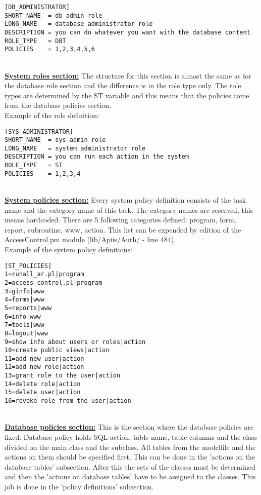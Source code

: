 \begin{verbatim}
[DB_ADMINISTRATOR]
SHORT_NAME  = db admin role 
LONG_NAME   = database administrator role
DESCRIPTION = you can do whatever you want with the database content
ROLE_TYPE   = DBT
POLICIES    = 1,2,3,4,5,6
\end{verbatim} 

\textbf{} \\
\underline{\textbf{System roles section:}}
The structure for this section is almost the same as for the database role section and the difference is in the role type only. The role types are determined by the ST variable and this means that the policies come from the database policies section.\\
\linebreak 
Example of the role definition:

\begin{verbatim}
[SYS_ADMINISTRATOR]
SHORT_NAME  = sys admin role 
LONG_NAME   = system administrator role
DESCRIPTION = you can run each action in the system
ROLE_TYPE   = ST
POLICIES    = 1,2,3,4
\end{verbatim} 

\textbf{} \\
\underline{\textbf{System policies section:}}
 Every system policy definition consists of the task name and the category name of this task. The category names are reserved, this means hardcoded. There are 5 following categories defined: program, form, report, subroutine, www, action. 
This list can be expended by edition of the AccessControl.pm module (lib/Apiis/Auth/ - line 484).\\

Example of the system policy definitions:

\begin{verbatim}
[ST_POLICIES]
1=runall_ar.pl|program
2=access_control.pl|program
3=ginfo|www
4=forms|www
5=reports|www
6=info|www
7=tools|www
8=logout|www
9=show info about users or roles|action
10=create public views|action
11=add new user|action
12=add new role|action
13=grant role to the user|action
14=delete role|action
15=delete user|action
16=revoke role from the user|action
\end{verbatim} 

\textbf{} \\
\underline{\textbf{Database policies section:}}
This is the section where the database policies are fixed. Database policy holds SQL action, table name, table columns and the class divided on the main class and the subclass. All tables from the modelfile and the actions on them should be specified first. This can be done in the 'actions on the database tables' subsection. After this the sets of the classes must be determined and then the 'actions on database tables' have to be assigned to the classes. This job is done in the 'policy definitions' subsection. \\

